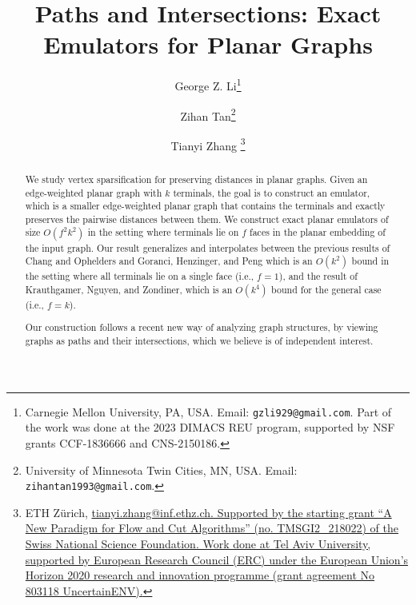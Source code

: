 \documentclass[11pt]{article}
\begin{document}
\begin{titlepage}
	
\title{Paths and Intersections: Exact Emulators for Planar Graphs}
\date{}
\author{George Z. Li\thanks{Carnegie Mellon University, PA, USA. Email: {\tt gzli929@gmail.com}. Part of the work was done at the 2023 DIMACS REU program, supported by NSF grants CCF-1836666 and CNS-2150186.}  
\and 
Zihan Tan\thanks{University of Minnesota Twin Cities, MN, USA. Email: {\tt zihantan1993@gmail.com}.}
\and 
Tianyi Zhang \thanks{ETH Zürich, \href{}{tianyi.zhang@inf.ethz.ch. Supported by the starting grant ``A New Paradigm for Flow and Cut Algorithms'' (no. TMSGI2\_218022) of the Swiss National Science Foundation. Work done at Tel Aviv University, supported by European Research Council (ERC) under the European Union’s Horizon 2020 research and innovation programme (grant agreement No 803118 UncertainENV).}} } 

\maketitle
	
\thispagestyle{empty}

\begin{abstract}
    We study vertex sparsification for preserving distances in planar graphs. Given an edge-weighted planar graph with $k$ terminals, the goal is to construct an emulator, which is a smaller edge-weighted planar graph that contains the terminals and exactly preserves the pairwise distances between them. We construct exact planar emulators of size $O(f^2k^2)$ in the setting where terminals lie on $f$ faces in the planar embedding of the input graph. Our result generalizes and interpolates between the previous results of Chang and Ophelders and Goranci, Henzinger, and Peng which is an $O(k^2)$ bound in the setting where all terminals lie on a single face (i.e., $f=1$), and the result of Krauthgamer, Nguyen, and Zondiner, which is an $O(k^4)$ bound for the general case (i.e., $f=k$).

    Our construction follows a recent new way of analyzing graph structures, by viewing graphs as paths and their intersections, which we believe is of independent interest.
\end{abstract}

\end{titlepage}

\tableofcontents

\newpage
\end{document}
